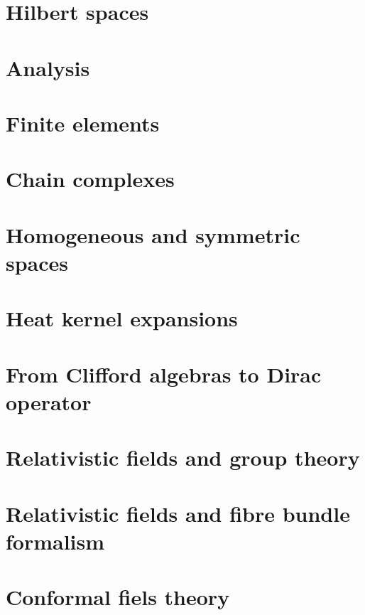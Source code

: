 \chapter{Hilbert spaces}



\chapter{Analysis}








\chapter{Finite elements}


\chapter{Chain complexes}


\chapter{Homogeneous and symmetric spaces}




\chapter{Heat kernel expansions}


\chapter{From Clifford algebras to Dirac operator}



\chapter{Relativistic fields and group theory}


\chapter{Relativistic fields and fibre bundle formalism}


\chapter{Conformal fiels theory}


